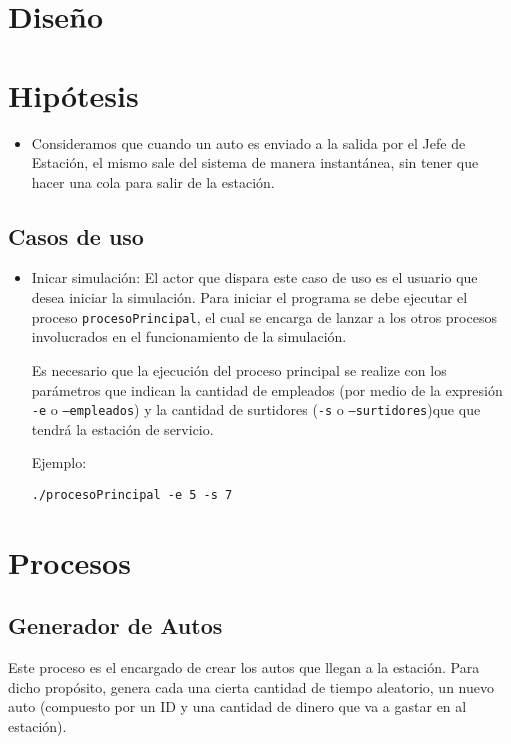 \documentclass[12pt,a4paper,spanish]{article}
\begin{document}

\newpage
\tableofcontents
\newpage
\section{Diseño}

\section{Hipótesis}

\begin{itemize}
	\item Consideramos que cuando un auto es enviado a la salida por el Jefe de Estación,
	el mismo sale del sistema de manera instantánea, sin tener que hacer una cola
	para salir de la estación.
\end{itemize}

\subsection{Casos de uso}

\begin{itemize}
	\item Inicar simulación: El actor que dispara este caso de uso es el usuario
	que desea iniciar la simulación. Para iniciar el programa se debe ejecutar el
	proceso \texttt{procesoPrincipal}, el cual se encarga de
	lanzar a los otros procesos involucrados en el funcionamiento de la simulación.

	Es necesario que la ejecución del proceso principal se realize con los parámetros
	que indican la cantidad de empleados (por medio de la expresión \texttt{-e} o \texttt{--empleados})
	y la cantidad de surtidores (\texttt{-s} o \texttt{--surtidores})que que tendrá la
	estación de servicio.

	Ejemplo:

	\texttt{./procesoPrincipal -e 5 -s 7}
\end{itemize}

\section{Procesos}

	\subsection{Generador de Autos}
		
		Este proceso es el encargado de crear los autos que llegan a la estación. Para
		dicho propósito, genera cada una cierta cantidad de tiempo aleatorio, un nuevo
		auto (compuesto por un ID y una cantidad de dinero que va a gastar en al estación).
\end{document}
